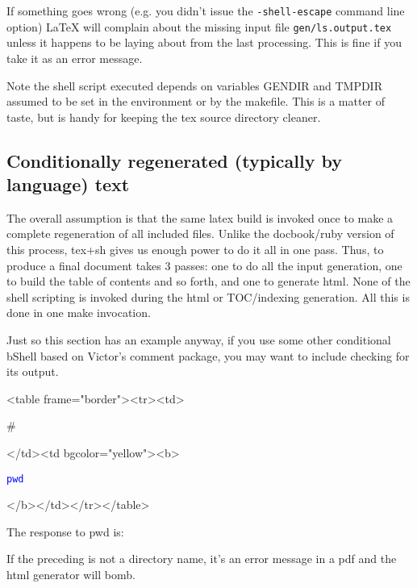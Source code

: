 \documentclass{article}
\def\prompt{\#}
\def\usershell#1{\larger \prompt \framebox{\texttt{\textcolor{Blue}{#1}}} \smaller }
\providecommand{\bShell}[2][]{}
\providecommand{\IfFileExists}[3]{#2}
\def\usershell#1{\begin{rawhtml}<table frame="border"><tr><td>\end{rawhtml}\prompt \begin{rawhtml}</td><td bgcolor="yellow"><b>\end{rawhtml}{\texttt{\textcolor{Blue}{#1}}}\begin{rawhtml}</b></td></tr></table>\end{rawhtml} }
\begin{document}
{}


\def\tobiShellFileName{tmp/shEsc.tmp}


If something goes wrong (e.g. you didn't issue the
\texttt{-shell-escape} command line option) \LaTeX{} will complain
about the missing input file \texttt{gen/ls.output.tex} unless it
happens to be laying about from the last processing.
This is fine if you take it as an error message. 

Note the shell script executed depends on variables GENDIR and TMPDIR
assumed to be set in the environment or by the makefile. This is a
matter of taste, but is handy for keeping the tex source directory
cleaner.

\subsection{Conditionally regenerated (typically by language) text}
\label{sec:conditional}

The overall assumption is that the same latex build is invoked once
to make a complete regeneration of all included files. 
Unlike the docbook/ruby version of this process, tex+sh gives us enough
power to do it all in one pass.
Thus, to produce a final document takes 3 passes:
one to do all the input generation, one to build the table
of contents and so forth, and one to generate html. None of the
shell scripting is invoked during the html or TOC/indexing generation.
All this is done in one make invocation.

Just so this section has an example anyway, if you use some other
conditional bShell based on Victor's comment package, you may want to 
include checking for its output.

\usershell{pwd}

The response to pwd is:

\IfFileExists{gen/pwd.cxx.output}{}{
{\color{red} File \texttt{gen/pwd.cxx.output} has
  not been generated. 
}
}

If the preceding is not a directory name, it's an error message in a pdf
and the html generator will bomb.
\end{document}
